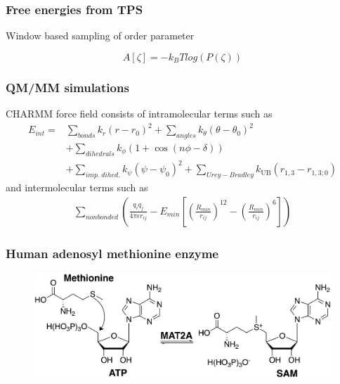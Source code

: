 \documentclass{beamer}
\begin{document}
\begin{frame}
\frametitle{Free energies from TPS}
Window based sampling of order parameter

\begin{equation}
A[\zeta] = -k_BTlog(P(\zeta))
\end{equation}
\end{frame}
\begin{frame}
\frametitle{QM/MM simulations}
CHARMM force field consists of intramolecular terms such as 
\begin{align}
E_{int} = &\sum_{bonds}k_r(r-r_{0})^2 + \sum_{angles}k_{\theta}(\theta - \theta_{0})^2 \nonumber \\ &+ \sum_{dihedrals}k_{\phi}(1+\cos(n\phi-\delta)) \nonumber \\
&+ \sum_{imp.\;dihed.} k_{\psi}(\psi - \psi_0)^2 + \sum_{Urey-Bradley} k_{\text{UB}}(r_{1,3}-r_{1,3;0}) \nonumber 
\end{align}\pause
and intermolecular terms such as 
\begin{align}
\sum_{nonbonded} \left(\frac{q_iq_j}{4\pi\epsilon r_{ij}} - E_{min} 
\left[\left(\frac{R_{min}}{r_{ij}}\right)^{12} - \left(\frac{R_{min}}{r_{ij}}\right)^{6} \right] \right)\nonumber 
\end{align}
\end{frame}
\begin{frame}
\frametitle{Human adenosyl methionine enzyme}
\begin{figure}
\centering 
\includegraphics[scale=0.6]{figures/mat2a-reaction.png}
\end{figure}
\end{frame}
\end{document}
